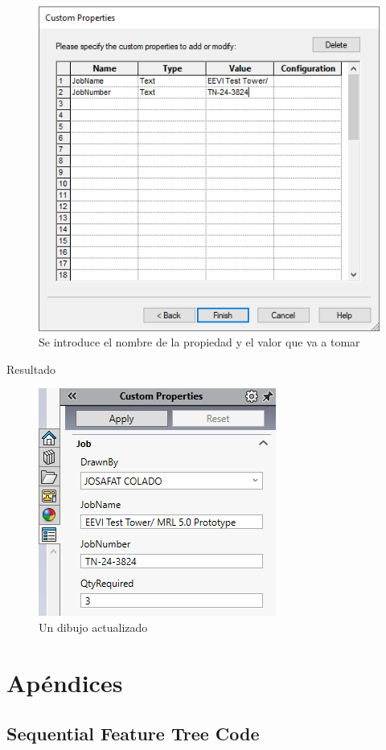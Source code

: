 \documentclass{report}
\begin{document}
\begin{figure}[H]
	\centering
	\includegraphics[width=0.65\linewidth, height=0.45\textheight,keepaspectratio]{Imagenes/solidworks_updatecustomprop03}
	\caption{Se introduce el nombre de la propiedad y el valor que va a tomar}
	\label{fig:solidworksupdatecustomprop03}
\end{figure}

\clearpage

{\LARGE Resultado}

\begin{figure}[H]
	\centering
	\includegraphics[width=0.55\linewidth, height=0.35\textheight,keepaspectratio]{Imagenes/solidworks_updatecustomprop04}
	\caption{Un dibujo actualizado}
	\label{fig:solidworksupdatecustomprop04}
\end{figure}

\part{Apéndices}

\appendix
\chapter{Sequential Feature Tree Code}
\end{document}
